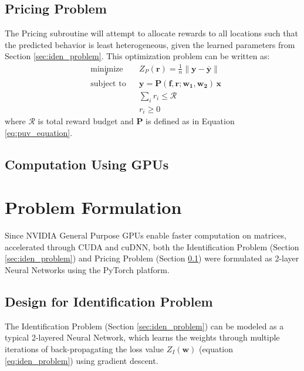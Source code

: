 \documentclass[12pt]{article}
\newcommand{\vect}[1]{\mathbf{#1}}  %
\newcommand{\matr}[1]{\mathbf{#1}}  %
\newcommand{\mean}[1]{\overline{#1}}    %
\begin{document}
    \subsection{Pricing Problem} \label{sec:pricing_problem}
    The Pricing subroutine will attempt to allocate rewards to all locations such that the predicted behavior is least heterogeneous, given the learned parameters from Section \ref{sec:iden_problem}. This optimization problem can be written as:
    \begin{equation} \label{eq:pricing_problem}
    \begin{aligned}
    & \underset{\vect{r}}{\text{minimize}}
    & & Z_P(\vect{r}) = \frac{1}{n}\lVert \vect{y} - \mean{\vect{y}} \rVert\\
    & \text{subject to}
    & & \vect{y} = \matr{P}(\matr{f}, \vect{r}; \matr{w_1}, \matr{w_2}) \, \vect{x}\\
    &&& \sum_{i} r_i \leq \mathcal{R}\\
    &&& r_i \geq 0
    \end{aligned}
    \end{equation}
    where $\mathcal{R}$ is total reward budget and $\matr{P}$ is defined as in Equation \ref{eq:puv_equation}.
    
    \subsection{Computation Using GPUs} \label{sec:comp_using_GPUs}
    
    \section{Problem Formulation}
    Since NVIDIA General Purpose GPUs enable faster computation on matrices, accelerated through CUDA and cuDNN, both the Identification Problem (Section \ref{sec:iden_problem}) and Pricing Problem (Section \ref{sec:pricing_problem}) were formulated as 2-layer Neural Networks using the PyTorch platform.
    
    \subsection{Design for Identification Problem}
    
    The Identification Problem (Section \ref{sec:iden_problem}) can be modeled as a typical 2-layered Neural Network, which learns the weights through multiple iterations of back-propagating the loss value $Z_I(\matr{w})$ (equation \ref{eq:iden_problem}) using gradient descent.
    
\end{document}
